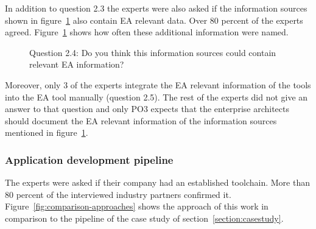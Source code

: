 In addition to question 2.3 the experts were also asked if the information sources shown in figure~\ref{fig:question24} also contain EA relevant data. Over 80 percent of the experts agreed. Figure~\ref{fig:question24} shows how often these additional information were named.

\begin{figure}[htpb]
\centering
{}
\caption{Question 2.4: Do you think this information sources could contain relevant EA information?}
\label{fig:question24}
\end{figure}
Moreover, only 3 of the experts integrate the EA relevant information of the tools into the EA tool manually (question 2.5). The rest of the experts did not give an answer to that question and only PO3 expects that the enterprise architects should document the EA relevant information of the information sources mentioned in figure~\ref{fig:question24}.

\subsubsection{Application development pipeline}
The experts were asked if their company had an established toolchain. More than 80 percent of the interviewed industry partners confirmed it. Figure~\ref{fig:comparison-approaches} shows the approach of this work in comparison to the pipeline of the case study of section~\ref{section:casestudy}.

